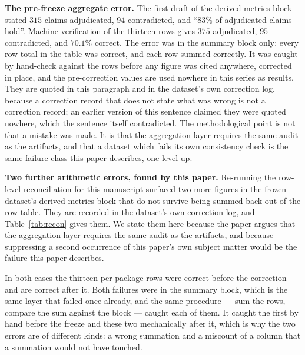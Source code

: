 \documentclass[sigconf,review]{acmart}
\begin{document}
\textbf{The pre-freeze aggregate error.} The first draft of the
derived-metrics block stated $315$ claims adjudicated, $94$ contradicted, and
``83\% of adjudicated claims hold''. Machine verification of the thirteen rows
gives $375$ adjudicated, $95$ contradicted, and $70.1\%$ correct. The error was
in the summary block only: every row total in the table was correct, and each
row summed correctly. It was caught by hand-check against the rows before any
figure was cited anywhere, corrected in place, and the pre-correction values
are used nowhere in this series as results. They are quoted in this paragraph
and in the dataset's own correction log, because a correction record that does
not state what was wrong is not a correction record; an earlier version of this
sentence claimed they were quoted nowhere, which the sentence itself
contradicted. The methodological point is not that a mistake
was made. It is that the aggregation layer requires the same audit as the
artifacts, and that a dataset which fails its own consistency check is the
same failure class this paper describes, one level up.

\textbf{Two further arithmetic errors, found by this paper.} Re-running the
row-level reconciliation for this manuscript surfaced two more figures in the
frozen dataset's derived-metrics block that do not survive being summed back
out of the row table. They are recorded in the dataset's own correction log,
and Table~\ref{tab:recon} gives them. We state them here because the paper
argues that the aggregation layer requires the same audit as the artifacts,
and because suppressing a second occurrence of this paper's own subject matter
would be the failure this paper describes.

In both cases the thirteen per-package rows were correct before the correction
and are correct after it. Both failures were in the summary block, which is
the same layer that failed once already, and the same procedure --- sum the
rows, compare the sum against the block --- caught each of them. It caught the
first by hand before the freeze and these two mechanically after it, which is
why the two errors are of different kinds: a wrong summation and a miscount of
a column that a summation would not have touched.
\end{document}
